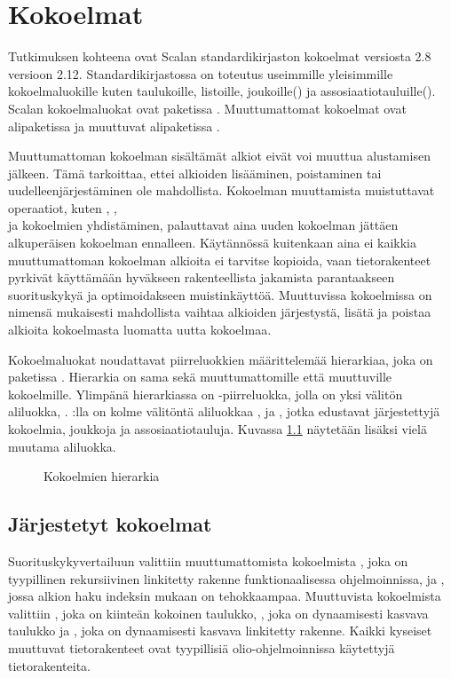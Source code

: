 \chapter{Kokoelmat} \label{Kokoelmat}
Tutkimuksen kohteena ovat Scalan standardikirjaston kokoelmat versiosta 2.8 versioon 2.12. Standardikirjastossa on toteutus useimmille yleisimmille kokoelmaluokille kuten taulukoille, listoille, joukoille() ja assosiaatiotauluille(). Scalan kokoelmaluokat ovat paketissa . Muuttumattomat kokoelmat ovat alipaketissa  ja muuttuvat alipaketissa .
\cite{scalaCollections}

Muuttumattoman kokoelman sisältämät alkiot eivät voi muuttua alustamisen jälkeen. Tämä tarkoittaa, ettei alkioiden lisääminen, poistaminen tai uudelleenjärjestäminen ole mahdollista. Kokoelman muuttamista muistuttavat operaatiot, kuten , , \\ ja kokoelmien yhdistäminen, palauttavat aina uuden kokoelman jättäen alkuperäisen kokoelman ennalleen. Käytännössä kuitenkaan aina ei kaikkia muuttumattoman kokoelman alkioita ei tarvitse kopioida, vaan tietorakenteet pyrkivät käyttämään hyväkseen rakenteellista jakamista parantaakseen suorituskykyä ja optimoidakseen muistinkäyttöä. Muuttuvissa kokoelmissa on nimensä mukaisesti mahdollista vaihtaa alkioiden järjestystä, lisätä ja poistaa alkioita kokoelmasta luomatta uutta kokoelmaa.
\cite{scalaCollections}
\cite[Luku 22]{prorgrammingInScala3rd}

Kokoelmaluokat noudattavat piirreluokkien määrittelemää hierarkiaa, joka on paketissa . Hierarkia on sama sekä muuttumattomille että muuttuville kokoelmille. Ylimpänä hierarkiassa on -piirreluokka, jolla on yksi välitön aliluokka, . :lla on kolme välitöntä aliluokkaa ,  ja , jotka edustavat järjestettyjä kokoelmia, joukkoja ja assosiaatiotauluja. Kuvassa \ref{kokoelmahierarkia} näytetään lisäksi vielä muutama aliluokka.
\cite{scalaCollections}
\begin{figure}[h]
    \centering
    \caption{Kokoelmien hierarkia}\label{kokoelmahierarkia}
\end{figure}


\section{Järjestetyt kokoelmat}
Suorituskykyvertailuun valittiin muuttumattomista kokoelmista , joka on tyypillinen rekursiivinen linkitetty rakenne funktionaalisessa ohjelmoinnissa, ja , jossa alkion haku indeksin mukaan on tehokkaampaa. Muuttuvista kokoelmista valittiin , joka on kiinteän kokoinen taulukko, , joka on dynaamisesti kasvava taulukko ja , joka on dynaamisesti kasvava linkitetty rakenne. Kaikki kyseiset muuttuvat tietorakenteet ovat tyypillisiä olio-ohjelmoinnissa käytettyjä tietorakenteita.

